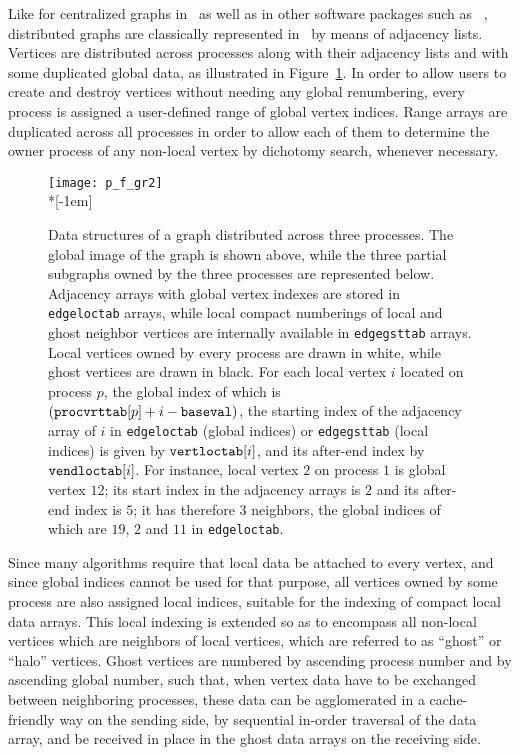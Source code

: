 \documentclass[fleqn,12pt,twoside]{article}
\newcommand{\lbt}{\linebreak[2]}
\begin{document}
Like for centralized graphs in \scotch\ as well as in other software
packages such as \metis~\cite{webmetis-parmetis}, distributed graphs
are classically represented in \ptscotch\ by means of adjacency
lists. Vertices are distributed across processes along with their
adjacency lists and with some duplicated global data, as illustrated
in Figure~\ref{fig-struct-graph}. In order to allow users to create
and destroy vertices without needing any global renumbering, every
process is assigned a user-defined range of global vertex
indices. Range arrays are duplicated across all processes in order to
allow each of them to determine the owner process of any non-local
vertex by dichotomy search, whenever necessary.

\begin{figure}
\texttt{[image: p\_f\_gr2]} \\*[-1em]
\caption{Data structures of a graph distributed across three
  processes. The global image of the graph is shown above, while the
  three partial subgraphs owned by the three processes are
  represented below.
  Adjacency arrays with global vertex indexes are stored in
  {\tt edge\protect\lbt loc\protect\lbt tab} arrays, while local
  compact numberings of local and ghost neighbor vertices are
  internally available in {\tt edge\protect\lbt gst\protect\lbt tab}
  arrays. Local vertices owned by every process are drawn in
  white, while ghost vertices are drawn in black. For each local
  vertex $i$ located on process $p$, the global index of which is
  $({\tt proc\protect\lbt vrt\protect\lbt tab[}p{\tt ]} + i - {\tt
  base\protect\lbt val})$, the starting index of the adjacency array
  of $i$ in {\tt edge\protect\lbt loc\protect\lbt tab} (global
  indices) or {\tt edge\protect\lbt gst\protect\lbt tab} (local
  indices) is given by ${\tt vert\protect\lbt loc\protect\lbt
  tab[}i{\tt ]}$, and its after-end index by ${\tt vend\protect\lbt
  loc\protect\lbt tab[}i{\tt ]}$. For instance, local vertex $2$ on
  process $1$ is global vertex $12$; its start index in the
  adjacency arrays is $2$ and its after-end index is $5$; it has
  therefore $3$ neighbors, the global indices of which are $19$, $2$
  and $11$ in  {\tt edge\protect\lbt loc\protect\lbt tab}.}
\label{fig-struct-graph}
\end{figure}

Since many algorithms require that local data be attached to every
vertex, and since global indices cannot be used for that purpose, all
vertices owned by some process are also assigned local indices,
suitable for the indexing of compact local data arrays. This local
indexing is extended so as to encompass all non-local vertices which
are neighbors of local vertices, which are referred to as ``ghost'' or
``halo'' vertices. Ghost vertices are numbered by ascending process
number and by ascending global number, such that, when vertex data
have to be exchanged between neighboring processes, these data can be
agglomerated in a cache-friendly way on the sending side, by
sequential in-order traversal of the data array, and be
received in place in the ghost data arrays on the receiving side.
\end{document}
